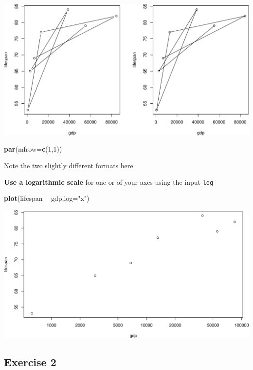 \documentclass[
]{book}
\newenvironment{Shaded}{\begin{snugshade}}{\end{snugshade}}
\newcommand{\DataTypeTok}[1]{\textcolor[rgb]{0.13,0.29,0.53}{#1}}
\newcommand{\DecValTok}[1]{\textcolor[rgb]{0.00,0.00,0.81}{#1}}
\newcommand{\KeywordTok}[1]{\textcolor[rgb]{0.13,0.29,0.53}{\textbf{#1}}}
\newcommand{\NormalTok}[1]{#1}
\newcommand{\OperatorTok}[1]{\textcolor[rgb]{0.81,0.36,0.00}{\textbf{#1}}}
\newcommand{\StringTok}[1]{\textcolor[rgb]{0.31,0.60,0.02}{#1}}
\begin{document}
\includegraphics{figures/unnamed-chunk-112-1.pdf}

\begin{Shaded}
\begin{Highlighting}[]
\KeywordTok{par}\NormalTok{(}\DataTypeTok{mfrow=}\KeywordTok{c}\NormalTok{(}\DecValTok{1}\NormalTok{,}\DecValTok{1}\NormalTok{))}
\end{Highlighting}
\end{Shaded}

Note the two slightly different formats here.

\textbf{Use a logarithmic scale} for one or of your axes using the input \texttt{log}

\begin{Shaded}
\begin{Highlighting}[]
\KeywordTok{plot}\NormalTok{(lifespan }\OperatorTok{~}\StringTok{ }\NormalTok{gdp,}\DataTypeTok{log=}\StringTok{"x"}\NormalTok{)}
\end{Highlighting}
\end{Shaded}

\includegraphics{figures/unnamed-chunk-113-1.pdf}

\hypertarget{exercise-2-4}{%
\subsection*{Exercise 2}\label{exercise-2-4}}
\end{document}
